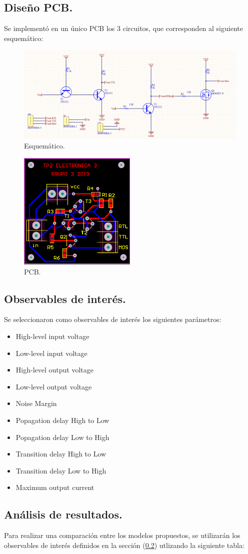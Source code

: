 \documentclass[a4paper]{article}
\begin{document}
\subsection{Diseño PCB.}
Se implementó en un único PCB los 3 circuitos, que corresponden al siguiente esquemático:
\begin{figure}[H]	
	\centering
	\includegraphics[width=\textwidth]{Imagenes/Esquematico.PNG}
	\caption{Esquemático.}
	\label{fig:esquematico}
\end{figure}
\begin{figure}[H]	
	\centering
	\includegraphics[width=0.5\textwidth]{Imagenes/PCB.PNG}
	\caption{PCB.}
	\label{fig:pcb}
\end{figure}

\subsection{Observables de interés.}
\label{sec:Obs}
Se seleccionaron como observables de interés los siguientes parámetros:
\begin{itemize}
\item High-level input voltage
\item Low-level input voltage
\item High-level output voltage
\item Low-level output voltage
\item Noise Margin
\item Popagation delay High to Low
\item Popagation delay Low to High
\item Transition delay High to Low
\item Transition delay Low to High
\item Maximum output current
\end{itemize}
\subsection{Análisis de resultados.}
Para realizar una comparación entre los modelos propuestos, se utilizarán los observables de interés definidos en la sección (\ref{sec:Obs}) utlizando la siguiente tabla:
\end{document}

